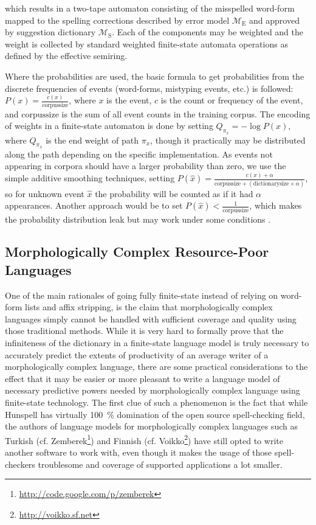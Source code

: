 \documentclass[a4paper,12pt]{article}
\begin{document}
which results in a two-tape automaton consisting of the misspelled word-form
mapped to the spelling corrections described by
error model $\mathcal{M}_\mathrm{E}$ and approved by suggestion dictionary 
$\mathcal{M}_\mathrm{S}$. Each of the components may be weighted and the
weight is collected by standard weighted finite-state automata operations as
defined by the effective semiring.

Where the probabilities are used, the basic formula to get probabilities from
the discrete frequencies of events (word-forms, mistyping events, etc.) is
followed: $P(x) = \frac{c(x)}{\mathrm{corpus size}}$, where $x$ is the event,
$c$ is the count or frequency of the event, and $\mathrm{corpus size}$ is the
sum of all event counts in the training corpus. The encoding of weights in a
finite-state automaton is done by setting $Q_{\pi_x} = -\log P(x)$, where
$Q_{\pi_x}$ is the end weight of path $\pi_x$, though it practically may be
distributed along the path depending on the specific implementation.  As events
not appearing in corpora should have a larger probability than zero, we use the
simple additive smoothing techniques, setting $P(\hat{x}) = \frac{c(x) +
\alpha}{\mathrm{corpus size} + (\mathrm{dictionary size} \times \alpha)}$, so
for unknown event $\hat{x}$ the probability will be counted as if it had
$\alpha$ appearances.  Another approach would be to set $P(\hat{x}) <
\frac{1}{\mathrm{corpus size}}$, which makes the probability distribution leak
but may work under some conditions \cite[]{brants2007large}.

\subsection{Morphologically Complex Resource-Poor Languages}
\label{subsec:morphologically-complex}

One of the main rationales of going fully finite-state instead of relying on
word-form lists and affix stripping, is the claim that morphologically complex
languages simply cannot be handled with sufficient coverage and quality using
those traditional methods. While it is very hard to formally prove that the
infiniteness of the dictionary in a finite-state language model is truly
necessary to accurately predict the extents of productivity of an average
writer of a morphologically complex language, there are some practical
considerations to the effect that it may be easier or more pleasant to write a
language model of necessary predictive powers needed by morphologically complex
language using finite-state technology. The first clue of such a phenomenon is
the fact that while Hunspell has virtually 100~\% domination of the open source
spell-checking field, the authors of language models for morphologically
complex languages such as Turkish (cf.
Zemberek\footnote{\url{http://code.google.com/p/zemberek}}) and Finnish (cf.
Voikko\footnote{\url{http://voikko.sf.net}}) have still opted to write another
software to work with, even though it makes the usage of those spell-checkers
troublesome and coverage of supported applications a lot smaller.
\end{document}
